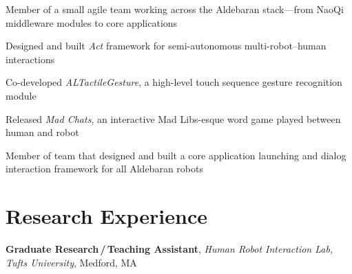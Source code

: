 \documentclass[10pt, letter]{article}
\newcommand{\years}[1]{\marginnote{\footnotesize #1}}
\newenvironment{desc*}{
  \begin{description}
    \setlength{\itemsep}{0.2pt}
    \setlength{\parskip}{-1pt}
    \setlength{\parsep}{0pt}
  }{
  \end{description}
}
\begin{document}
Member of a small agile team working across the Aldebaran stack---from NaoQi middleware modules to core applications
\begin{itemize}[leftmargin=*, parsep=1pt, rightmargin=1.5cm]
  {\light
\item Designed and built \textit{Act} framework for semi-autonomous multi-robot--human interactions
\item Co-developed \textit{ALTactileGesture}, a high-level touch sequence gesture recognition module
\item Released \textit{Mad Chats}, an interactive Mad Libs-esque word game played between human and
  robot
\item Member of team that designed and built a core application launching and dialog interaction
  framework for all Aldebaran robots
  }
\end{itemize}

\section*{Research Experience}
\years{2012 - 2014} 
\textbf{Graduate Research\,/\,Teaching Assistant}, 
\textit{Human Robot Interaction Lab, Tufts University}, Medford, MA\bigskip
\end{document}
